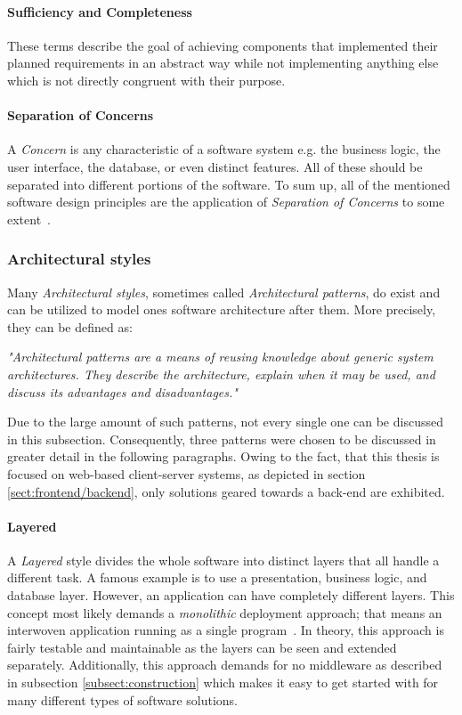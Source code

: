 \documentclass[12pt,a4paper]{report}
\begin{document}
\paragraph{Sufficiency and Completeness}
These terms describe the goal of achieving components that implemented their
planned requirements in an abstract way while not implementing anything else
which is not directly congruent with their purpose.

\paragraph{Separation of Concerns}
A \textit{Concern} is any characteristic of a software system
e.g. the business logic, the user interface, the database, or even distinct features.
All of these should be separated into different portions of the software.
To sum up, all of the mentioned software design principles are the application
of \textit{Separation of Concerns} to some extent~\cite{mitchell-managing-se}.


\subsubsection{Architectural styles} \label{subsubsect:architectural-styles}

Many \textit{Architectural styles}, sometimes called \textit{Architectural patterns},
do exist and can be utilized to model ones software architecture after them.
More precisely, they can be defined as:
\begin{displayquote}
\emph{"Architectural patterns are a means of reusing knowledge about
generic system architectures. They describe the architecture,
explain when it may be used, and discuss its advantages and disadvantages."}~\cite{sommerville-se}
\end{displayquote}
Due to the large amount of such patterns, not every single one can be discussed
in this subsection. Consequently, three patterns were chosen to be discussed
in greater detail in the following paragraphs. Owing to the fact, that this
thesis is focused on web-based client-server systems, as depicted in
section \ref{sect:frontend/backend}, only solutions geared towards a back-end are exhibited.

\paragraph{Layered}
A \textit{Layered} style divides the whole software into distinct layers that
all handle a different task. A famous example is to use a presentation,
business logic, and database layer. However, an application can have completely different
layers. This concept most likely demands a \textit{monolithic} deployment approach;
that means an interwoven application running as a single program~\cn.
In theory, this approach is fairly testable and maintainable
as the layers can be seen and extended separately. Additionally, this approach demands
for no middleware as described in subsection \ref{subsect:construction} which
makes it easy to get started with for many different types of software solutions.
\end{document}
